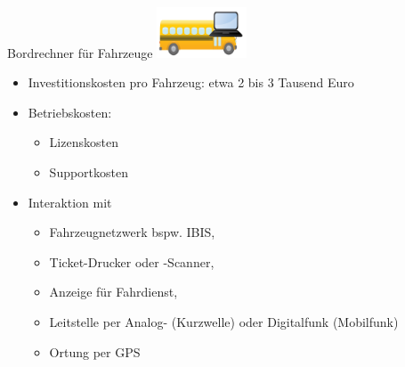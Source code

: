 
\begin{frame}{Bordrechner für Fahrzeuge}
  \includegraphics[width=0.2\textwidth]{otm-june-2-2021/bus.png}
  \begin{itemize}
  \item Investitionskosten pro Fahrzeug: etwa 2 bis 3 Tausend Euro
  \item Betriebskosten:
    \begin{itemize}
    \item Lizenskosten
    \item Supportkosten
    \end{itemize}
  \item Interaktion mit
    \begin{itemize}
    \item Fahrzeugnetzwerk bspw. IBIS,
    \item Ticket-Drucker oder -Scanner,
    \item Anzeige für Fahrdienst,
    \item Leitstelle per Analog- (Kurzwelle) oder Digitalfunk (Mobilfunk)
    \item Ortung per GPS
    \end{itemize}
  \end{itemize}
\end{frame}

